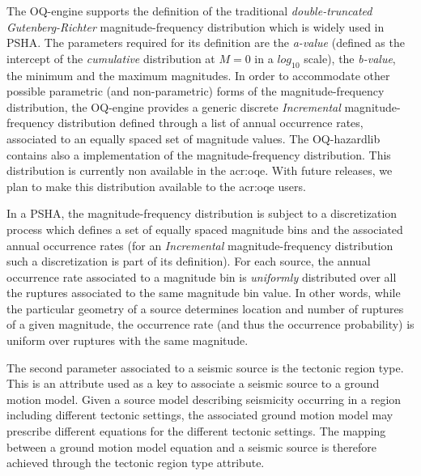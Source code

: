 The OQ-engine supports the definition of the traditional
\textit{double-truncated Gutenberg-Richter} magnitude-frequency distribution
which is widely used in PSHA. 
%
The parameters required for its definition are the \textit{a-value}
(defined as the intercept of the \textit{cumulative} distribution at $M=0$ in a
$log_{10}$ scale), the \textit{b-value}, the minimum and the maximum magnitudes.
%
In order to accommodate other possible parametric (and non-parametric) forms of
the magnitude-frequency distribution, the OQ-engine provides a generic discrete
\textit{Incremental} magnitude-frequency distribution defined through a list of
annual occurrence rates, associated to an equally spaced set of magnitude
values.
%
The OQ-hazardlib contains also a implementation of the \textcite{youngs1985}
magnitude-frequency distribution. This distribution is currently non available 
in the \gls{acr:oqe}. With future releases, we plan to make this distribution
available to the \gls{acr:oqe} users.

In a PSHA, the magnitude-frequency distribution is subject to a discretization
process which defines a set of equally spaced magnitude bins and the associated
annual occurrence rates (for an \textit{Incremental} magnitude-frequency
distribution such a discretization is part of its definition). For each source,
the annual occurrence rate associated to a magnitude bin is \textit{uniformly}
distributed over all the ruptures associated to the same magnitude bin value. In
other words, while the particular geometry of a source determines location and
number of ruptures of a given magnitude, the occurrence rate (and thus the
occurrence probability) is uniform over ruptures with the same magnitude.

The second parameter associated to a seismic source is the tectonic region type.
This is an attribute used as a key to associate a seismic source to a ground
motion model. Given a source model describing seismicity occurring in a region
including different tectonic settings, the associated ground motion model may
prescribe different equations for the different tectonic settings. The mapping
between a ground motion model equation and a seismic source is therefore
achieved through the tectonic region type attribute.

